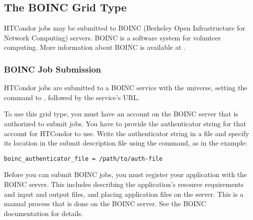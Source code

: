 \subsection{\label{sec:Gce}The BOINC Grid Type }

HTCondor jobs may be submitted to BOINC (Berkeley Open Infrastructure
for Network Computing) servers.
BOINC is a software system for volunteer computing.
More information about BOINC is available at
.

\subsubsection{\label{sec:Boinc-submit}BOINC Job Submission}

HTCondor jobs are submitted to a BOINC service
with the  universe, setting the
 command to , followed 
by the service's URL.



To use this grid type, you must have an account on the BOINC server
that is authorized to submit jobs.
You have to provide the authenticator string for that account for
HTCondor to use.
Write the authenticator string in a file and specify its location in
the submit description file using the
 command, as in the example:
\begin{verbatim}
boinc_authenticator_file = /path/to/auth-file
\end{verbatim}

Before you can submit BOINC jobs, you must register your application
with the BOINC server.
This includes describing the application's resource requirements and
input and output files, and placing application files on the server.
This is a manual process that is done on the BOINC server.
See the BOINC documentation for details.

